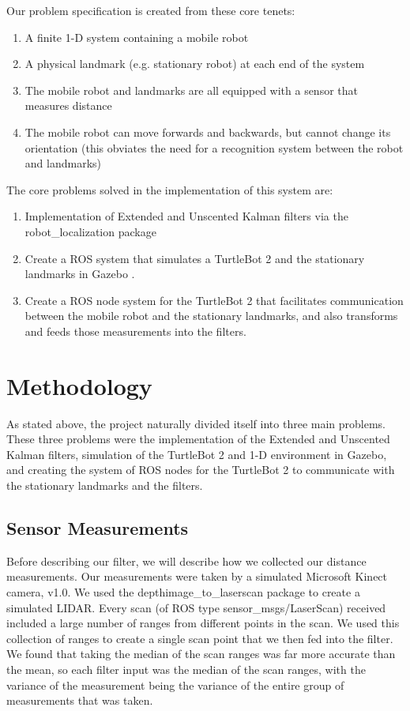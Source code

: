 \documentclass[conference]{IEEEtran} \usepackage[T1]{fontenc} \usepackage[backend=biber, style=ieee]{biblatex}
\begin{document}
Our problem specification is created from these core tenets:
\begin{enumerate} 
\item A finite 1-D system containing a mobile robot 
\item A physical landmark (e.g. stationary robot) at each end of the system \item The mobile robot and
landmarks are all equipped with a sensor that measures distance \item The mobile robot can move forwards and backwards,
but cannot change its orientation (this obviates the need for a recognition system between the robot and landmarks)
\end{enumerate}

The core problems solved in the implementation of this system are:
\begin{enumerate} \item Implementation of Extended and Unscented Kalman filters via the robot\_localization package \cite{robot_localization}
\item Create a ROS system that simulates a TurtleBot 2 and the stationary landmarks in Gazebo \cite{gazebo}.
\item Create a ROS node system for the TurtleBot 2 that facilitates communication between the mobile robot and the stationary landmarks, and also
transforms and feeds those measurements into the filters. 
\end{enumerate} 

\section{Methodology} \label{Methodology} As stated above, the project naturally divided itself into three main
problems. These three problems were the implementation of the Extended and Unscented Kalman filters, simulation of the
TurtleBot 2 and 1-D environment in Gazebo, and creating the system of ROS nodes for the TurtleBot 2 to communicate with
the stationary landmarks and the filters.

\subsection{Sensor Measurements} \label{Sensor Measurements} Before describing our filter, we will describe how we
collected our distance measurements. Our measurements were taken by a simulated Microsoft Kinect camera, v1.0. We used
the depthimage\_to\_laserscan package \cite{depth_to_scan} to create a simulated LIDAR. Every scan (of ROS type
sensor\_msgs/LaserScan) received included a large number of ranges from different points in the scan. We used this
collection of ranges to create a single scan point that we then fed into the filter. We found that taking the median of
the scan ranges was far more accurate than the mean, so each filter input was the median of the scan ranges, with the
variance of the measurement being the variance of the entire group of measurements that was taken.
\end{document}
